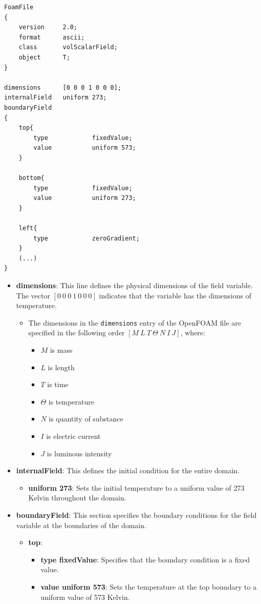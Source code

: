 \documentclass{article}
\begin{document}
\begin{verbatim}
FoamFile
{
    version     2.0;
    format      ascii;
    class       volScalarField;
    object      T;
}

dimensions      [0 0 0 1 0 0 0];
internalField   uniform 273;
boundaryField
{
    top{
        type            fixedValue;
        value           uniform 573;
    }

    bottom{
        type            fixedValue;
        value           uniform 273;
    }

    left{
        type            zeroGradient;
    }
    (...)
}
\end{verbatim}


\begin{itemize}
    \item \textbf{dimensions}: This line defines the physical dimensions of the field variable. The vector \([0 \ 0 \ 0 \ 1 \ 0 \ 0 \ 0]\) indicates that the variable has the dimensions of temperature.
    \begin{itemize}
        \item The dimensions in the \texttt{dimensions} entry of the OpenFOAM file are specified in the following order $[M \ L \ T \ \Theta \ N \ I \ J]$, where:
        \begin{itemize}
            \item \(M\) is mass
            \item \(L\) is length
            \item \(T\) is time
            \item \(\Theta\) is temperature
            \item \(N\) is quantity of substance
            \item \(I\) is electric current
            \item \(J\) is luminous intensity
        \end{itemize}
    \end{itemize}

    \item \textbf{internalField}: This defines the initial condition for the entire domain.
    \begin{itemize}
        \item \textbf{uniform 273}: Sets the initial temperature to a uniform value of 273 Kelvin throughout the domain.
    \end{itemize}

    \item \textbf{boundaryField}: This section specifies the boundary conditions for the field variable at the boundaries of the domain.
    \begin{itemize}
        \item \textbf{top}:
        \begin{itemize}
            \item \textbf{type fixedValue}: Specifies that the boundary condition is a fixed value.
            \item \textbf{value uniform 573}: Sets the temperature at the top boundary to a uniform value of 573 Kelvin.
        \end{itemize}


\end{itemize}
\end{itemize}
\end{document}
